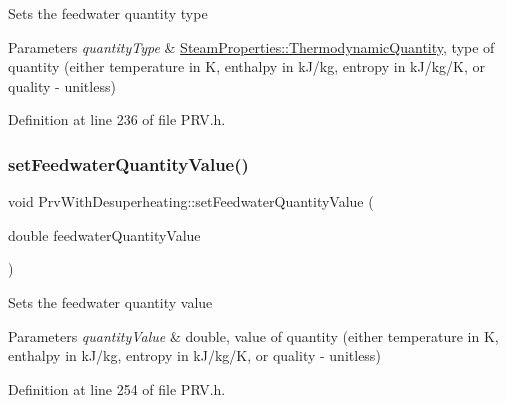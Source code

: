 Sets the feedwater quantity type


\begin{DoxyParams}{Parameters}
{\em quantity\+Type} & \hyperlink{class_steam_properties_ae0294bedf7d178c2d8fb6aed0f62fbff}{Steam\+Properties\+::\+Thermodynamic\+Quantity}, type of quantity (either temperature in K, enthalpy in k\+J/kg, entropy in k\+J/kg/K, or quality -\/ unitless) \\
\hline
\end{DoxyParams}


Definition at line 236 of file P\+R\+V.\+h.

\mbox{\label{class_prv_with_desuperheating_afc17940f7d61898eda1bb4a6f1fea8c3}} 
\subsubsection{\texorpdfstring{set\+Feedwater\+Quantity\+Value()}{setFeedwaterQuantityValue()}\hspace{0.1cm}{\footnotesize\ttfamily [1/3]}}
{\footnotesize\ttfamily void Prv\+With\+Desuperheating\+::set\+Feedwater\+Quantity\+Value (\begin{DoxyParamCaption}\item[{double}]{feedwater\+Quantity\+Value }\end{DoxyParamCaption})\hspace{0.3cm}{\ttfamily [inline]}}

Sets the feedwater quantity value


\begin{DoxyParams}{Parameters}
{\em quantity\+Value} & double, value of quantity (either temperature in K, enthalpy in k\+J/kg, entropy in k\+J/kg/K, or quality -\/ unitless) \\
\hline
\end{DoxyParams}


Definition at line 254 of file P\+R\+V.\+h.

\mbox{\label{class_prv_with_desuperheating_afc17940f7d61898eda1bb4a6f1fea8c3}} 
